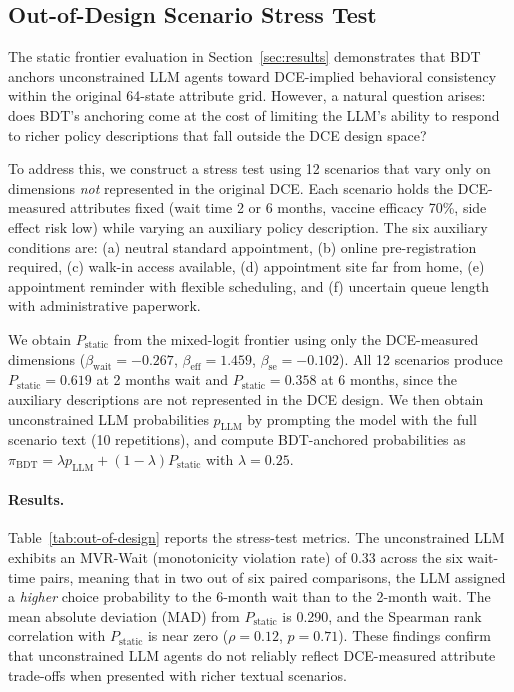 \subsection{Out-of-Design Scenario Stress Test}
\label{sec:out-of-design-stress}

The static frontier evaluation in Section~\ref{sec:results} demonstrates that BDT anchors unconstrained LLM agents toward DCE-implied behavioral consistency within the original 64-state attribute grid. However, a natural question arises: does BDT's anchoring come at the cost of limiting the LLM's ability to respond to richer policy descriptions that fall outside the DCE design space?

To address this, we construct a stress test using 12 scenarios that vary only on dimensions \emph{not} represented in the original DCE. Each scenario holds the DCE-measured attributes fixed (wait time 2 or 6 months, vaccine efficacy 70\%, side effect risk low) while varying an auxiliary policy description. The six auxiliary conditions are: (a) neutral standard appointment, (b) online pre-registration required, (c) walk-in access available, (d) appointment site far from home, (e) appointment reminder with flexible scheduling, and (f) uncertain queue length with administrative paperwork.

We obtain $P_{\mathrm{static}}$ from the mixed-logit frontier using only the DCE-measured dimensions ($\beta_{\mathrm{wait}} = -0.267$, $\beta_{\mathrm{eff}} = 1.459$, $\beta_{\mathrm{se}} = -0.102$). All 12 scenarios produce $P_{\mathrm{static}} = 0.619$ at 2 months wait and $P_{\mathrm{static}} = 0.358$ at 6 months, since the auxiliary descriptions are not represented in the DCE design. We then obtain unconstrained LLM probabilities $p_{\mathrm{LLM}}$ by prompting the model with the full scenario text (10 repetitions), and compute BDT-anchored probabilities as $\pi_{\mathrm{BDT}} = \lambda p_{\mathrm{LLM}} + (1 - \lambda) P_{\mathrm{static}}$ with $\lambda = 0.25$.

\paragraph{Results.}
Table~\ref{tab:out-of-design} reports the stress-test metrics. The unconstrained LLM exhibits an MVR-Wait (monotonicity violation rate) of 0.33 across the six wait-time pairs, meaning that in two out of six paired comparisons, the LLM assigned a \emph{higher} choice probability to the 6-month wait than to the 2-month wait. The mean absolute deviation (MAD) from $P_{\mathrm{static}}$ is 0.290, and the Spearman rank correlation with $P_{\mathrm{static}}$ is near zero ($\rho = 0.12$, $p = 0.71$). These findings confirm that unconstrained LLM agents do not reliably reflect DCE-measured attribute trade-offs when presented with richer textual scenarios.

